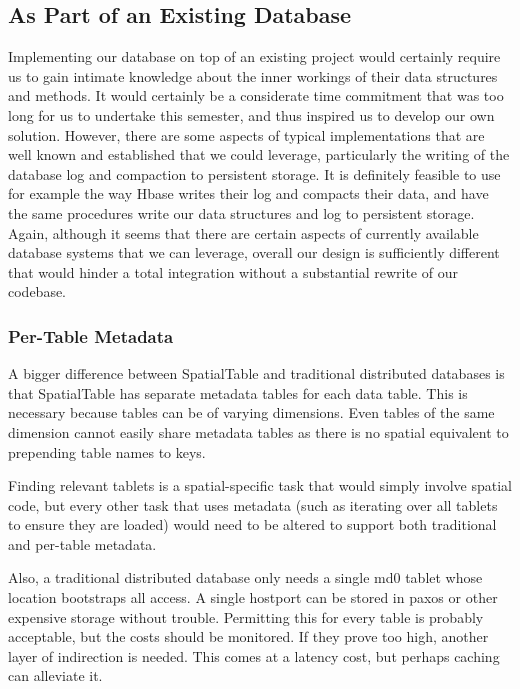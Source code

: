 \documentclass[11pt]{article}
\begin{document}
\subsection{As Part of an Existing Database}
Implementing our database on top of an existing project would certainly require us to gain intimate knowledge about the inner workings of their data structures and methods. It would certainly be a considerate time commitment that was too long for us to undertake this semester, and thus inspired us to develop our own solution. However, there are some aspects of typical implementations that are well known and established that we could leverage, particularly the writing of the database log and compaction to persistent storage. It is definitely feasible to use for example the way Hbase writes their log and compacts their data, and have the same procedures write our data structures and log to persistent storage. Again, although it seems that there are certain aspects of currently available database systems that we can leverage, overall our design is sufficiently different that would hinder a total integration without a substantial rewrite of our codebase.

\subsubsection{Per-Table Metadata}

A bigger difference between SpatialTable and traditional distributed databases is that SpatialTable has separate metadata tables for each data table.  This is necessary because tables can be of varying dimensions.  Even tables of the same dimension cannot easily share metadata tables as there is no spatial equivalent to prepending table names to keys.

Finding relevant tablets is a spatial-specific task that would simply involve spatial code, but every other task that uses metadata (such as iterating over all tablets to ensure they are loaded) would need to be altered to support both traditional and per-table metadata.

Also, a traditional distributed database only needs a single md0 tablet whose location bootstraps all access.  A single hostport can be stored in paxos or other expensive storage without trouble.  Permitting this for every table is probably acceptable, but the costs should be monitored.  If they prove too high, another layer of indirection is needed.  This comes at a latency cost, but perhaps caching can alleviate it.
\end{document}
